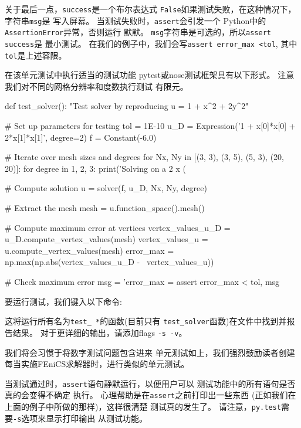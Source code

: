 \noindent
关于最后一点，\texttt{success}是一个布尔表达式
\texttt{False}如果测试失败，在这种情况下，字符串\texttt{msg}是
写入屏幕。 当测试失败时，\texttt{assert}会引发一个
Python中的\texttt{AssertionError}异常，否则运行
默默。 \texttt{msg}字符串是可选的，所以\texttt{assert success}是
最小测试。 在我们的例子中，我们会写\verb!assert error_max <tol!,
其中\texttt{tol}是上述容限。

在该单元测试中执行适当的测试功能
pytest或nose测试框架具有以下形式。 注意
我们对不同的网格分辨率和度数执行测试
有限元。

\begin{python}
def test_solver():
    "Test solver by reproducing u = 1 + x^2 + 2y^2"

    # Set up parameters for testing
    tol = 1E-10
    u_D = Expression('1 + x[0]*x[0] + 2*x[1]*x[1]', degree=2)
    f = Constant(-6.0)

    # Iterate over mesh sizes and degrees
    for Nx, Ny in [(3, 3), (3, 5), (5, 3), (20, 20)]:
        for degree in 1, 2, 3:
            print('Solving on a 2 x (%

            # Compute solution
            u = solver(f, u_D, Nx, Ny, degree)

            # Extract the mesh
            mesh = u.function_space().mesh()

            # Compute maximum error at vertices
            vertex_values_u_D = u_D.compute_vertex_values(mesh)
            vertex_values_u  = u.compute_vertex_values(mesh)
            error_max = np.max(np.abs(vertex_values_u_D - \
                                      vertex_values_u))

            # Check maximum error
            msg = 'error_max = %
            assert error_max < tol, msg
\end{python}

要运行测试，我们键入以下命令:

这将运行所有名为\verb!test_ *!的函数(目前只有
\verb!test_solver!函数)在文件中找到并报告结果。
对于更详细的输出，请添加flags \texttt{-s -v}。

我们将会习惯于将数字测试问题包含进来
单元测试如上，我们强烈鼓励读者创建
每当实施FEniCS求解器时，进行类似的单元测试。

\begin{notice}[提示:在测试功能中打印消息]
当测试通过时，\texttt{assert}语句静默运行，以便用户可以
测试功能中的所有语句是否真的会变得不确定
执行。 心理帮助是在\texttt{assert}之前打印出一些东西
(正如我们在上面的例子中所做的那样)，这样很清楚
测试真的发生了。
请注意，\texttt{py.test}需要\texttt{-s}选项来显示打印输出
从测试功能。
\end{notice}

